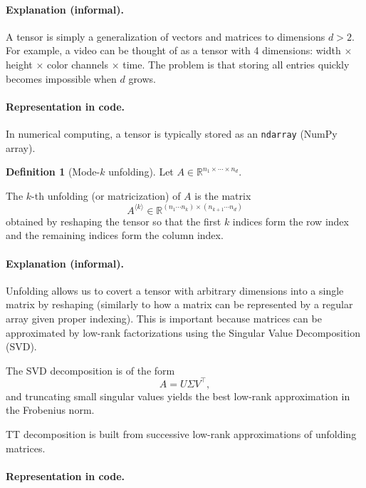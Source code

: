 \documentclass[11pt,a4paper,parskip=half-]{scrartcl}
\newcommand{\code}[1]{\texttt{#1}}
\theoremstyle{definition}
\newtheorem{definition}{Definition}[section]
\theoremstyle{plain}
\theoremstyle{remark}
\begin{document}
\paragraph{Explanation (informal).}

A tensor is simply a generalization of vectors and matrices to dimensions $d >
2$. For example, a video can be thought of as a tensor with 4 dimensions: width
$\times$ height $\times$ color channels $\times$ time. The problem is that
storing all entries quickly becomes impossible when $d$ grows.

\paragraph{Representation in code.}

In numerical computing, a tensor is typically stored as an \code{ndarray}
(NumPy array).

\begin{definition}[Mode-$k$ unfolding]
  Let $A \in \mathbb{R}^{n_1 \times \cdots \times n_d}$.

  The $k$-th unfolding (or matricization) of $A$ is the matrix
  \[
    A^{\langle k\rangle}
    \in
    \mathbb{R}^{(n_1 \cdots n_k)\times(n_{k+1}\cdots n_d)}
  \]
  obtained by reshaping the tensor so that the first $k$
  indices form the row index and the remaining indices form
  the column index.
\end{definition}

\paragraph{Explanation (informal).}

Unfolding allows us to covert a tensor with arbitrary dimensions into a single
matrix by reshaping (similarly to how a matrix can be represented by a regular
array given proper indexing). This is important because matrices can be
approximated by low-rank factorizations using the Singular Value Decomposition
(SVD).

The SVD decomposition is of the form
\[
  A = U \Sigma V^\top,
\]
and truncating small singular values yields the best low-rank approximation in
the Frobenius norm.

TT decomposition is built from successive low-rank approximations of unfolding
matrices\cite{Oseledets2011TT}.

\paragraph{Representation in code.}
\end{document}
